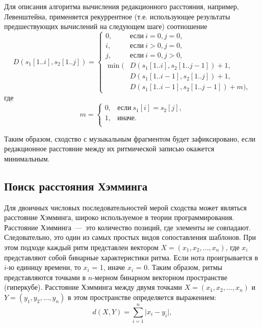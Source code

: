 Для описания алгоритма вычисления редакционного расстояния, например, Левенштейна, применяется рекуррентное (т.е. использующее результаты предшествующих вычислений на следующем шаге) соотношение
\begin{equation}
\label{eqn:lev_formula}
	D(s_1[1..i], s_2[1..j]) = \begin{cases}
      	0,& \text{если}\ i = 0, j = 0, \\ 
        i,& \text{если}\ i > 0, j = 0, \\ 
        j,& \text{если}\ i = 0, j > 0, \\
     
      \min ( & D(s_1[1..i], s_2[1..j - 1]) + 1, \\
      & D(s_1[1..i - 1], s_2[1..j]) + 1, \\
      & D(s_1[1..i - 1], s_2[1..j - 1]) + m
      ),
      \end{cases}
\end{equation}
где
\begin{equation}
	m = \begin{cases}
      0, & \text{если}\ s_1[i] = s_2[j], \\
      1, & \text{иначе}. \\
      \end{cases}
\end{equation}

Таким образом, сходство с музыкальным фрагментом будет зафиксировано, если редакционное расстояние между их ритмической записью окажется минимальным.

\subsection{Поиск расстояния Хэмминга}

Для двоичных числовых последовательностей мерой сходства может являться расстояние Хэмминга, широко используемое в теории программирования. Расстояние Хэмминга~---~это количество позиций, где элементы не совпадают. Следовательно, это один из самых простых видов сопоставления шаблонов. При этом подходе каждый ритм представлен вектором $X = (x_1, x_2, ..., x_n)$, где $x_i$ представляют собой бинарные характеристики ритма. Если нота проигрывается в $i$-ю единицу времени, то $x_i$ = 1, иначе $x_i$ = 0. Таким образом, ритмы представляются точками в $n$-мерном бинарном векторном пространстве (гиперкубе). Расстояние Хэмминга между двумя точками $X = (x_1,x_2,...,x_n)$ и $Y = (y_1,y_2,...,y_n)$ в этом пространстве определяется выражением:
\begin{equation}
	d(X,Y) = \sum_{i = 1}^{n} \lvert x_i - y_i \rvert,
\end{equation}

